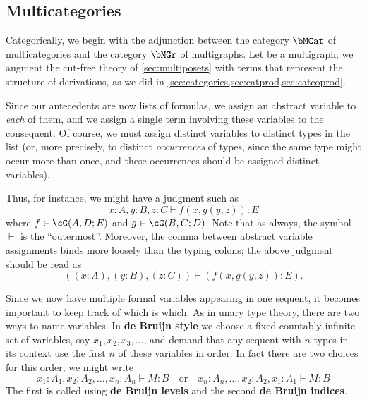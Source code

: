 \documentclass{book}
\let\types\vdash
\begin{document}
\subsection{Multicategories}
\label{sec:multicats}

Categorically, we begin with the adjunction between the category $\bMCat$ of multicategories and the category $\bMGr$ of multigraphs.
Let \cG be a multigraph; we augment the cut-free theory of \cref{sec:multiposets} with terms that represent the structure of derivations, as we did in \cref{sec:categories,sec:catprod,sec:catcoprod}.

Since our antecedents are now lists of formulas, we assign an abstract variable to \emph{each} of them, and we assign a single term involving these variables to the consequent.
Of course, we must assign distinct variables to distinct types in the list (or, more precisely, to distinct \emph{occurrences} of types, since the same type might occur more than once, and these occurrences should be assigned distinct variables).

Thus, for instance, we might have a judgment such as
\[ x:A, y:B, z:C \types f(x,g(y,z)):E \]
where $f\in\cG(A,D;E)$ and $g\in\cG(B,C;D)$.
Note that as always, the symbol $\types$ is the ``outermost''.
Moreover, the comma between abstract variable assignments binds more loosely than the typing colons; the above judgment should be read as
\[ ((x:A), (y:B), (z:C)) \types (f(x,g(y,z)):E). \]

Since we now have multiple formal variables appearing in one sequent, it becomes important to keep track of which is which.
As in unary type theory, there are two ways to name variables.
In \textbf{de Bruijn style} we choose a fixed countably infinite set of variables, say $x_1,x_2,x_3,\dots$, and demand that any sequent with $n$ types in its context use the first $n$ of these variables in order.
In fact there are two choices for this order; we might write
\[ x_1:A_1, x_2:A_2, \dots,x_n:A_n \types M:B \quad\text{or}\quad
x_n:A_n,\dots, x_2:A_2, x_1:A_1 \types M:B
\]
The first is called using \textbf{de Bruijn levels} and the second \textbf{de Bruijn indices}.
\end{document}
